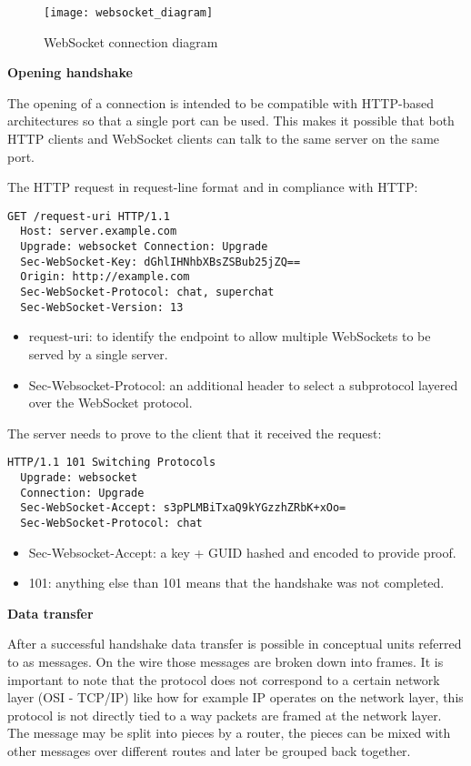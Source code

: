 \begin{figure}[h]
  \caption{WebSocket connection diagram}
  \texttt{[image: websocket\_diagram]}
  \centering
\end{figure}

\textbf{Opening handshake}

The opening of a connection is intended to be compatible with HTTP-based architectures so that a single port can be used. This makes it possible that both HTTP clients and WebSocket clients can talk to the same server on the same port. \cite{ws-rfc}

The HTTP request in request-line format and in compliance with HTTP:
\begin{lstlisting}[caption=WebSocket opening handshake HTTP GET Upgrade request, style=nohighlight]
  GET /request-uri HTTP/1.1 
  Host: server.example.com 
  Upgrade: websocket Connection: Upgrade 
  Sec-WebSocket-Key: dGhlIHNhbXBsZSBub25jZQ== 
  Origin: http://example.com 
  Sec-WebSocket-Protocol: chat, superchat 
  Sec-WebSocket-Version: 13  
\end{lstlisting}

\begin{itemize}
  \item request-uri:  to identify the endpoint to allow multiple WebSockets to be served by a single server.
  \item Sec-Websocket-Protocol: an additional header to select a subprotocol layered over the WebSocket protocol.
\end{itemize}

The server needs to prove to the client that it received the request:
\begin{lstlisting}[caption=WebSocket opening handshake server response, style=nohighlight]
  HTTP/1.1 101 Switching Protocols
  Upgrade: websocket
  Connection: Upgrade
  Sec-WebSocket-Accept: s3pPLMBiTxaQ9kYGzzhZRbK+xOo=
  Sec-WebSocket-Protocol: chat
\end{lstlisting}

\begin{itemize}
  \item Sec-Websocket-Accept: a key + GUID hashed and encoded to provide proof.
  \item 101: anything else than 101 means that the handshake was not completed.
\end{itemize}

\textbf{Data transfer}

After a successful handshake data transfer is possible in conceptual units referred to as messages. On the wire those messages are broken down into frames. It is important to note that the protocol does not correspond to a certain network layer (OSI - TCP/IP) like how for example IP operates on the network layer, this protocol is not directly tied to a way packets are framed at the network layer. The message may be split into pieces by a router, the pieces can be mixed with other messages over different routes and later be grouped back together. \cite{ws-rfc}

